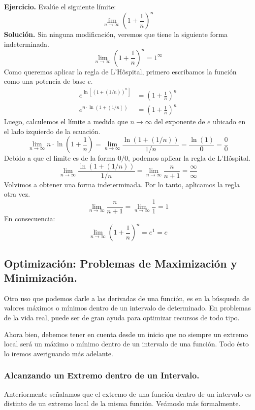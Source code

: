 \documentclass[12pt]{article}
\begin{document}
\textbf{Ejercicio.} \quad Evalúe el siguiente límite:
\[
\lim_{n \to \infty} \left(1 + \frac{1}{n}\right)^{n}
\]
\textbf{Solución.} \quad Sin ninguna modificación, veremos que tiene la siguiente forma indeterminada.
\[
\lim_{n \to \infty} \left(1 + \frac{1}{n}\right)^{n} = 1^{\infty}
\]
Como queremos aplicar la regla de L'Hôspital, primero escribamos la función como una potencia de base $e$.
\begin{align*}
	e^{\ln[(1 + (1/n))^{n}]} &= \left(1 + \frac{1}{n}\right)^{n} \\
	e^{n \cdot \ln(1 + (1/n))} &= \left(1 + \frac{1}{n}\right)^{n}
\end{align*}
Luego, calculemos el límite a medida que $n \to \infty$ del exponente de $e$ ubicado en el lado izquierdo de la ecuación.
\[
\lim_{n \to \infty} n \cdot \ln\left(1 + \frac{1}{n}\right) = 
\lim_{n \to \infty} \frac{\ln(1 + (1/n))}{1/n} = 
\frac{\ln(1)}{0} = \frac{0}{0}
\]
Debido a que el límite es de la forma $0/0$, podemos aplicar la regla de L'Hôspital.
\[
\lim_{n \to \infty} \frac{\ln(1 + (1/n))}{1/n} =
\lim_{n \to \infty} \frac{n}{n + 1} = \frac{\infty}{\infty}
\]
Volvimos a obtener una forma indeterminada. Por lo tanto, aplicamos la regla otra vez.
\[
\lim_{n \to \infty} \frac{n}{n + 1} =
\lim_{n \to \infty} \frac{1}{1} = 1
\]
En consecuencia:
\[
\lim_{n \to \infty} \left(1 + \frac{1}{n}\right)^{n} = e^{1} = e
\]

\newpage

\subsection{Optimización: Problemas de Maximización y Minimización.}

Otro uso que podemos darle a las derivadas de una función, es en la búsqueda de valores máximos o mínimos dentro de un intervalo de determinado. En problemas de la vida real, puede ser de gran ayuda para optimizar recursos de todo tipo.

Ahora bien, debemos tener en cuenta desde un inicio que no siempre un extremo local será un máximo o mínimo dentro de un intervalo de una función. Todo ésto lo iremos averiguando más adelante.


\subsubsection{Alcanzando un Extremo dentro de un Intervalo.}

Anteriormente señalamos que el extremo de una función dentro de un intervalo es distinto de un extremo local de la misma función. Veámoslo más formalmente.
\end{document}
